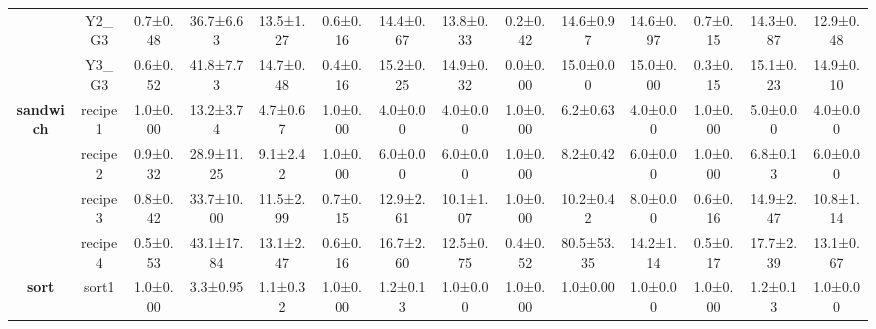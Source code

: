 \documentclass[11pt]{article}
\theoremstyle{plain}
\theoremstyle{remark}
\begin{document}
\begin{table}[t]
\begin{center}
\begin{small}
\begin{sc}
\begin{adjustbox}{width=1\textwidth}
\begin{tabular}{ccccccccccclll}
                          & \multicolumn{1}{c|}{Y2\_G3}  & 0.7±0.48  & 36.7±6.63  & \multicolumn{1}{c|}{13.5±1.27} & 0.6±0.16  & 14.4±0.67  & \multicolumn{1}{c|}{13.8±0.33} & 0.2±0.42  & 14.6±0.97    & \multicolumn{1}{c|}{14.6±0.97} & \multicolumn{1}{c}{0.7±0.15}  & \multicolumn{1}{c}{14.3±0.87}  & \multicolumn{1}{c}{12.9±0.48} \\
                          & \multicolumn{1}{c|}{Y3\_G3}  & 0.6±0.52  & 41.8±7.73  & \multicolumn{1}{c|}{14.7±0.48} & 0.4±0.16  & 15.2±0.25  & \multicolumn{1}{c|}{14.9±0.32} & 0.0±0.00  & 15.0±0.00    & \multicolumn{1}{c|}{15.0±0.00} & \multicolumn{1}{c}{0.3±0.15}  & \multicolumn{1}{c}{15.1±0.23}  & \multicolumn{1}{c}{14.9±0.10} \\ \hline
\multirow{4}{*}{\textbf{sandwich}} & \multicolumn{1}{c|}{recipe1} & 1.0±0.00  & 13.2±3.74  & \multicolumn{1}{c|}{4.7±0.67}  & 1.0±0.00  & 4.0±0.00   & \multicolumn{1}{c|}{4.0±0.00}  & 1.0±0.00  & 6.2±0.63     & \multicolumn{1}{c|}{4.0±0.00}  & \multicolumn{1}{c}{1.0±0.00}  & \multicolumn{1}{c}{5.0±0.00}   & \multicolumn{1}{c}{4.0±0.00}  \\
                          & \multicolumn{1}{c|}{recipe2} & 0.9±0.32  & 28.9±11.25 & \multicolumn{1}{c|}{9.1±2.42}  & 1.0±0.00  & 6.0±0.00   & \multicolumn{1}{c|}{6.0±0.00}  & 1.0±0.00  & 8.2±0.42     & \multicolumn{1}{c|}{6.0±0.00}  & \multicolumn{1}{c}{1.0±0.00}  & \multicolumn{1}{c}{6.8±0.13}   & \multicolumn{1}{c}{6.0±0.00}  \\
                          & \multicolumn{1}{c|}{recipe3} & 0.8±0.42  & 33.7±10.00 & \multicolumn{1}{c|}{11.5±2.99} & 0.7±0.15  & 12.9±2.61  & \multicolumn{1}{c|}{10.1±1.07} & 1.0±0.00  & 10.2±0.42    & \multicolumn{1}{c|}{8.0±0.00}  & \multicolumn{1}{c}{0.6±0.16}  & \multicolumn{1}{c}{14.9±2.47}  & \multicolumn{1}{c}{10.8±1.14} \\
                          & \multicolumn{1}{c|}{recipe4} & 0.5±0.53  & 43.1±17.84 & \multicolumn{1}{c|}{13.1±2.47} & 0.6±0.16  & 16.7±2.60  & \multicolumn{1}{c|}{12.5±0.75} & 0.4±0.52  & 80.5±53.35   & \multicolumn{1}{c|}{14.2±1.14} & \multicolumn{1}{c}{0.5±0.17}  & \multicolumn{1}{c}{17.7±2.39}  & \multicolumn{1}{c}{13.1±0.67} \\ \hline
\multirow{5}{*}{\textbf{sort}}     & \multicolumn{1}{c|}{sort1}   & 1.0±0.00  & 3.3±0.95   & \multicolumn{1}{c|}{1.1±0.32}  & 1.0±0.00  & 1.2±0.13   & \multicolumn{1}{c|}{1.0±0.00}  & 1.0±0.00  & 1.0±0.00     & \multicolumn{1}{c|}{1.0±0.00}  & \multicolumn{1}{c}{1.0±0.00}  & \multicolumn{1}{c}{1.2±0.13}   & \multicolumn{1}{c}{1.0±0.00}  \\

\end{tabular}
\end{adjustbox}
\end{sc}
\end{small}
\end{center}
\end{table}
\end{document}
